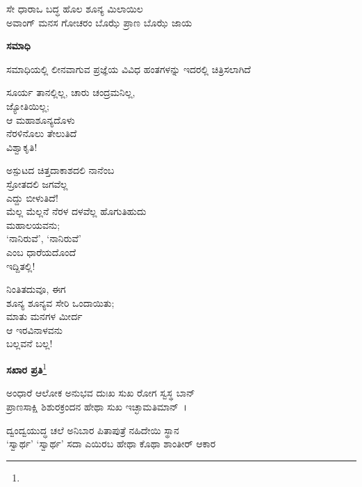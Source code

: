 \begin{myquote}
ಸೇ ಧಾರಾಒ ಬದ್ಧ ಹೊಲ ಶೂನ್ಯ ಮಿಲಾಯಿಲ\\ಅವಾಂಗ್ ಮನಸ ಗೋಚರಂ ಬೊಝೆ ಪ್ರಾಣ ಬೊಝೆ ಜಾಯ
\end{myquote}


\begin{center}
\textbf{ಸಮಾಧಿ}
\end{center}

ಸಮಾಧಿಯಲ್ಲಿ ಲೀನವಾಗುವ ಪ್ರಜ್ಞೆಯ ವಿವಿಧ ಹಂತಗಳನ್ನು ಇದರಲ್ಲಿ ಚಿತ್ರಿಸಲಾಗಿದೆ

\begin{myquote}
ಸೂರ್ಯ ತಾನಲ್ಲಿಲ್ಲ, ಚಾರು ಚಂದ್ರಮನಿಲ್ಲ,\\ಜ್ಯೋತಿಯಿಲ್ಲ;\\ಆ ಮಹಾಶೂನ್ಯದೊಳು\\ನೆರಳಿನೊಲು ತೇಲುತಿದೆ\\ವಿಶ್ವಾಕೃತಿ!
\end{myquote}

\begin{myquote}
ಅಸ್ಪುಟದ ಚಿತ್ತದಾಕಾಶದಲಿ ನಾನೆಂಬ\\ಸ್ರೋತದಲಿ ಜಗವೆಲ್ಲ\\ಎದ್ದು ಬೀಳುತಿದೆ!\\ಮೆಲ್ಲ ಮೆಲ್ಲನೆ ನೆರಳ ದಳವೆಲ್ಲ ಹೊಗುತಿಹುದು\\ಮಹಾಲಯವನು;\\‘ನಾನಿರುವೆ’, ‘ನಾನಿರುವೆ’\\ಎಂಬ ಧಾರೆಯದೊಂದೆ\\ಇದ್ದಿತಲ್ಲಿ!
\end{myquote}

\begin{myquote}
ನಿಂತಿತದುವೂ, ಈಗ\\ಶೂನ್ಯ ಶೂನ್ಯವ ಸೇರಿ ಒಂದಾಯಿತು;\\ಮಾತು ಮನಗಳ ಮೀರ್ದ\\ಆ ಇರವಿನಾಳವನು\\ಬಲ್ಲವನೆ ಬಲ್ಲ!
\end{myquote}

\begin{center}
\textbf{ಸಖಾರ ಪ್ರತಿ}\footnote{}
\end{center}

\begin{myquote}
ಅಂಧಾರೆ ಆಲೋಕ ಅನುಭವ ದುಃಖ ಸುಖ ರೋಗ ಸ್ವಸ್ಥ ಬಾನ್\\ಪ್ರಾಣಸಾಕ್ಷಿ ಶಿಶುರಕ್ರಂದನ ಹೇಥಾ ಸುಖ ಇಚ್ಛಾಮತಿಮಾನ್~।
\end{myquote}


\begin{myquote}
ದ್ವಂದ್ವಯುದ್ಧ ಚಲೆ ಅನಿಬಾರ ಪಿತಾಪುತ್ರೆ ನಹಿದೇಯಿ ಸ್ಥಾನ\\‘ಸ್ವಾರ್ಥ’ ‘ಸ್ವಾರ್ಥ’ ಸದಾ ಎಯಿರಬ ಹೇಥಾ ಕೊಥಾ ಶಾಂತೀರ್ ಆಕಾರ
\end{myquote}

